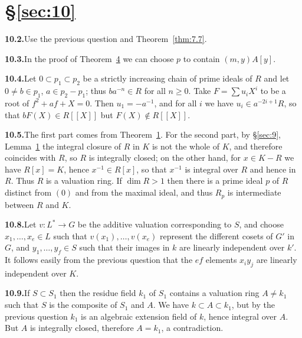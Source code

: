 
\section*{\S\ref{sec:10}}

\noindent\textbf{10.2.}\quad Use the previous question and Theorem~\ref{thm:7.7}.

\noindent\textbf{10.3.}\quad In the proof of Theorem~\hyperref[thm:10.4]{4} we can choose $p$ to contain $(m, y)A[y]$.

\noindent\textbf{10.4.}\quad Let $0 \subset p_1 \subset p_2$ be a strictly increasing chain of prime ideals of $R$ and let
$0 \neq b \in p_1$, $a \in p_2 - p_1$; thus $ba^{-n} \in R$ for all $n \ge 0$. Take $F = \sum u_iX^i$ to be a
root of $f^2 + af + X = 0$. Then $u_1 = -a^{-1}$, and for all $i$ we have
$u_i \in a^{-2i+1}R$, so that $bF(X) \in R[[X]]$ but $F(X) \notin R[[X]]$.

\noindent\textbf{10.5.}\quad The first part comes from Theorem~\hyperref[thm:10.1]{1}. For the second part, by \S\ref{sec:9}, Lemma~\hyperref[lem:9.1]{1}
the integral closure of $R$ in $K$ is not the whole of $K$, and therefore coincides
with $R$, so $R$ is integrally closed; on the other hand, for $x \in K - R$ we have
$R[x] = K$, hence $x^{-1} \in R[x]$, so that $x^{-1}$ is integral over $R$ and hence in $R$.
Thus $R$ is a valuation ring. If $\dim R > 1$ then there is a prime ideal $p$ of $R$
distinct from $(0)$ and from the maximal ideal, and thus $R_p$ is intermediate
between $R$ and $K$.

\noindent\textbf{10.8.}\quad Let $v\colon L^* \to G$ be the additive valuation corresponding to $S$, and choose
$x_1, \ldots, x_e \in L$ such that $v(x_1), \ldots, v(x_e)$ represent the different cosets of $G'$ in
$G$, and $y_1, \ldots, y_f \in S$ such that their images in $k$ are linearly independent
over $k'$. It follows easily from the previous question that the $ef$ elements
$x_iy_j$ are linearly independent over $K$.

\noindent\textbf{10.9.}\quad If $S \subset S_1$ then the residue field $k_1$ of $S_1$ contains a valuation ring $A \neq k_1$
such that $S$ is the composite of $S_1$ and $A$. We have $k \subset A \subset k_1$, but by the
previous question $k_1$ is an algebraic extension field of $k$, hence integral
over $A$. But $A$ is integrally closed, therefore $A = k_1$, a contradiction.

